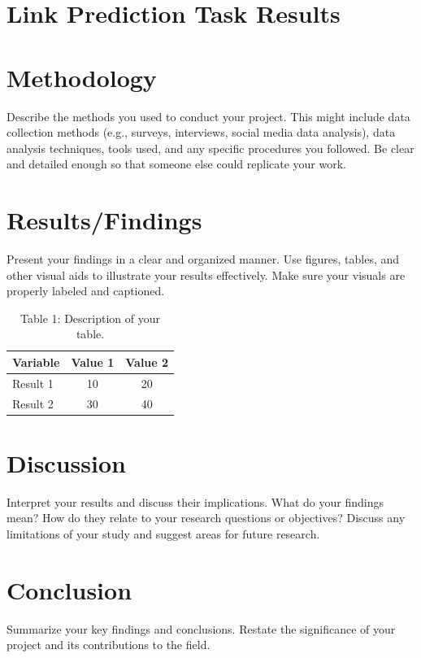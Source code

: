 \documentclass[11pt]{article}
\begin{document}
	
	
	
	   
	
	\section{Link Prediction Task Results}
	
	\section{Methodology}
	
	Describe the methods you used to conduct your project. This might include data collection methods (e.g., surveys, interviews, social media data analysis), data analysis techniques, tools used, and any specific procedures you followed. Be clear and detailed enough so that someone else could replicate your work.
	
	\section{Results/Findings}
	
	Present your findings in a clear and organized manner.  Use figures, tables, and other visual aids to illustrate your results effectively.  Make sure your visuals are properly labeled and captioned.
	
	
	\begin{table}[h!]
		\centering
		\begin{tabular}{lcc}
			\toprule
			Variable & Value 1 & Value 2 \\
			\midrule
			Result 1 & 10 & 20 \\
			Result 2 & 30 & 40 \\
			\bottomrule
		\end{tabular}
		\caption{Table 1: Description of your table.}
	\end{table}
	
	\section{Discussion}
	
	Interpret your results and discuss their implications.  What do your findings mean?  How do they relate to your research questions or objectives?  Discuss any limitations of your study and suggest areas for future research.
	
	\section{Conclusion}
	
	Summarize your key findings and conclusions.  Restate the significance of your project and its contributions to the field.
	
	
	
	
	
\end{document}
